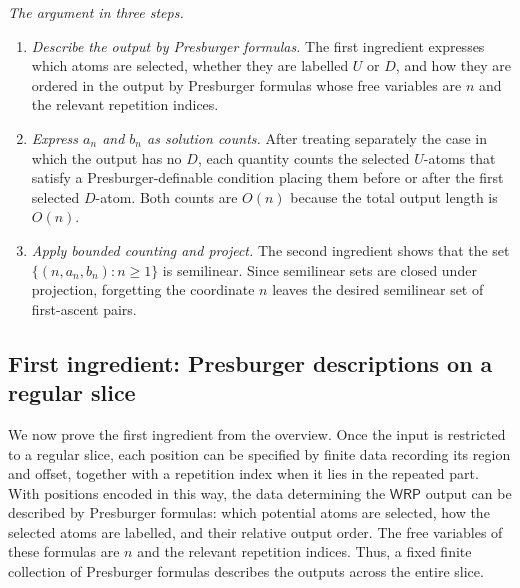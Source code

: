 \documentclass[11pt]{article}
\theoremstyle{definition}
\newcommand{\WRP}{\mathsf{WRP}}
\begin{document}
\vspace{0.5em}
\noindent\emph{The argument in three steps.}
\begin{enumerate}[label=(\arabic*)]
\item \emph{Describe the output by Presburger formulas.}  The first ingredient
expresses which atoms are selected, whether they are labelled $U$ or $D$, and
how they are ordered in the output by Presburger formulas whose free variables
are $n$ and the relevant repetition indices.
\item \emph{Express $a_n$ and $b_n$ as solution counts.}  After treating
separately the case in which the output has no $D$, each quantity counts the
selected $U$-atoms that satisfy a Presburger-definable condition placing them
before or after the first selected $D$-atom.  Both counts are $O(n)$ because
the total output length is $O(n)$.
\item \emph{Apply bounded counting and project.}  The second ingredient shows
that the set $\{(n,a_n,b_n):n\ge 1\}$ is semilinear.  Since semilinear sets are
closed under projection, forgetting the coordinate $n$ leaves the desired
semilinear set of first-ascent pairs.
\end{enumerate}

\subsection{First ingredient: Presburger descriptions on a regular slice}

We now prove the first ingredient from the overview.  Once the input is
restricted to a regular slice, each position can be specified by finite data
recording its region and offset, together with a repetition index when it lies
in the repeated part.  With positions encoded in this way, the data determining
the $\WRP$ output can be described by Presburger formulas: which potential atoms
are selected, how the selected atoms are labelled, and their relative output
order.  The free variables of these formulas are $n$ and the relevant repetition
indices.  Thus, a fixed finite collection of Presburger formulas describes the
outputs across the entire slice.
\end{document}
